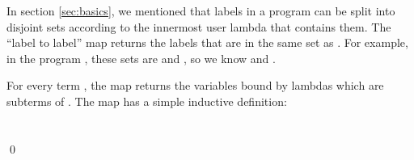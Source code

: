 \documentclass{LMCS}
\theoremstyle{definition} \newtheorem{property}[thm]{Property}
\begin{document}
In section \ref{sec:basics}, we mentioned that labels in a program can be split
into disjoint sets according to the innermost user lambda that contains them.
The ``label to label'' map \ltol{\psi} returns the labels that are in the same 
set as .
For example, in the program , these sets are 
 and , so we know  
and .

\begin{defi}
For every term , the map  returns the variables bound by lambdas 
which are subterms of .
The map has a simple inductive definition: \\
 \\
 \\

\qed
\end{defi}
\end{document}
